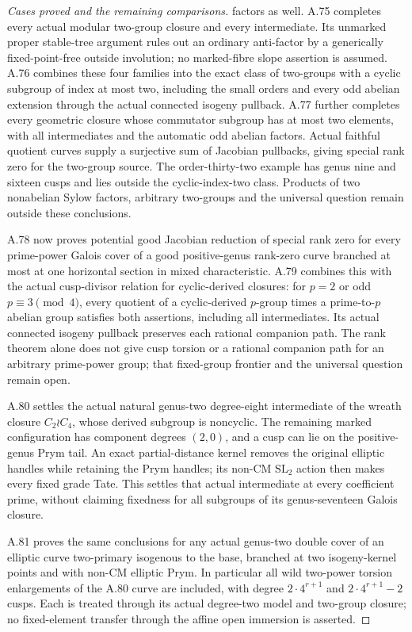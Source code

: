 \begin{proof}[Cases proved and the remaining comparisons]
factors as well.
A.75 completes every actual modular two-group closure and
every intermediate. Its unmarked proper stable-tree argument
rules out an ordinary anti-factor by a generically fixed-point-free
outside involution; no marked-fibre slope assertion is assumed.
A.76 combines these four families into the exact class of
two-groups with a cyclic subgroup of index at most two, including
the small orders and every odd abelian extension through the
actual connected isogeny pullback.
A.77 further completes every geometric closure whose commutator
subgroup has at most two elements, with all intermediates and
the automatic odd abelian factors. Actual faithful quotient
curves supply a surjective sum of Jacobian pullbacks, giving
special rank zero for the two-group source. The order-thirty-two
example has genus nine and sixteen cusps and lies outside the
cyclic-index-two class. Products of two nonabelian Sylow factors,
arbitrary two-groups and the universal question remain outside
these conclusions.

A.78 now proves potential good Jacobian reduction of special
rank zero for every prime-power Galois cover of a good
positive-genus rank-zero curve branched at most at one
horizontal section in mixed characteristic. A.79 combines
this with the actual cusp-divisor relation for cyclic-derived
closures: for \(p=2\) or odd \(p\equiv3\pmod4\),
every quotient of a cyclic-derived \(p\)-group times a
prime-to-\(p\) abelian group satisfies both assertions,
including all intermediates. Its actual connected isogeny
pullback preserves each rational companion path.
The rank theorem alone does not give cusp torsion or a
rational companion path for an arbitrary prime-power group;
that fixed-group frontier and the universal question remain
open.


A.80 settles the actual natural genus-two degree-eight intermediate
of the wreath closure \(C_2\wr C_4\), whose derived subgroup
is noncyclic. The remaining marked configuration has component
degrees \((2,0)\), and a cusp can lie on the positive-genus
Prym tail. An exact partial-distance kernel removes the original
elliptic handles while retaining the Prym handles; its non-CM
\(\mathrm{SL}_2\) action then makes every fixed grade Tate.
This settles that actual intermediate at every coefficient prime,
without claiming fixedness for all subgroups of its genus-seventeen
Galois closure.

A.81 proves the same conclusions for any actual genus-two double
cover of an elliptic curve two-primary isogenous to the base,
branched at two isogeny-kernel points and with non-CM elliptic
Prym. In particular all wild two-power torsion enlargements of
the A.80 curve are included, with degree \(2\cdot4^{r+1}\)
and \(2\cdot4^{r+1}-2\) cusps. Each is treated through its
actual degree-two model and two-group closure; no fixed-element
transfer through the affine open immersion is asserted.









\end{proof}
